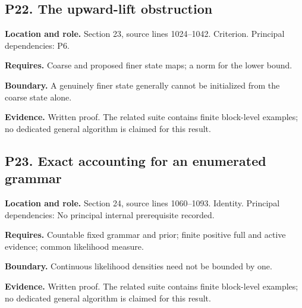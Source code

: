 \documentclass[11pt,letterpaper]{article}
\begin{document}
\par\noindent\begin{minipage}{\textwidth}
\subsection{P22. The upward-lift
obstruction}\label{p22.-the-upward-lift-obstruction}

\textbf{Location and role.} Section 23, source lines 1024--1042.
Criterion. Principal dependencies: P6.

\textbf{Requires.} Coarse and proposed finer state maps; a norm for the
lower bound.

\textbf{Boundary.} A genuinely finer state generally cannot be
initialized from the coarse state alone.

\textbf{Evidence.} Written proof. The related suite contains finite
block-level examples; no dedicated general algorithm is claimed for this
result.
\end{minipage}\par\medskip

\par\noindent\begin{minipage}{\textwidth}
\subsection{P23. Exact accounting for an enumerated
grammar}\label{p23.-exact-accounting-for-an-enumerated-grammar}

\textbf{Location and role.} Section 24, source lines 1060--1093.
Identity. Principal dependencies: No principal internal prerequisite
recorded.

\textbf{Requires.} Countable fixed grammar and prior; finite positive
full and active evidence; common likelihood measure.

\textbf{Boundary.} Continuous likelihood densities need not be bounded
by one.

\textbf{Evidence.} Written proof. The related suite contains finite
block-level examples; no dedicated general algorithm is claimed for this
result.
\end{minipage}\par\medskip
\end{document}
